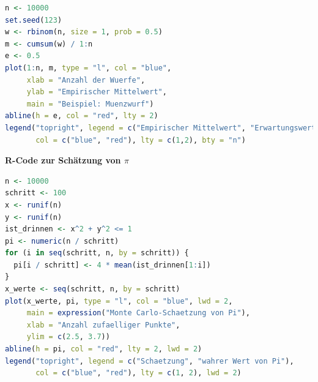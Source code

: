\documentclass[aodsor,preprint]{imsart}
\numberwithin{equation}{section}
\theoremstyle{plain}
\begin{document}
\begin{lstlisting}[language=R, caption={Simulation von Münzwürfen mit R}, label={lst:muenzenwurf}]
n <- 10000
set.seed(123)
w <- rbinom(n, size = 1, prob = 0.5)
m <- cumsum(w) / 1:n
e <- 0.5
plot(1:n, m, type = "l", col = "blue",
     xlab = "Anzahl der Wuerfe",
     ylab = "Empirischer Mittelwert",
     main = "Beispiel: Muenzwurf")
abline(h = e, col = "red", lty = 2)
legend("topright", legend = c("Empirischer Mittelwert", "Erwartungswert (0.5)"),
       col = c("blue", "red"), lty = c(1,2), bty = "n")
\end{lstlisting}

\textbf{R-Code zur Schätzung von \texorpdfstring{$\pi$}{π}}

\begin{lstlisting}[language=R, caption={Monte-Carlo-Schaetzung von $\pi$ mit R}, label={lst:pi_montecarlo}]
n <- 10000
schritt <- 100
x <- runif(n)
y <- runif(n)
ist_drinnen <- x^2 + y^2 <= 1
pi <- numeric(n / schritt)
for (i in seq(schritt, n, by = schritt)) {
  pi[i / schritt] <- 4 * mean(ist_drinnen[1:i])
}
x_werte <- seq(schritt, n, by = schritt)
plot(x_werte, pi, type = "l", col = "blue", lwd = 2,
     main = expression("Monte Carlo-Schaetzung von Pi"),
     xlab = "Anzahl zufaelliger Punkte",
     ylim = c(2.5, 3.7))
abline(h = pi, col = "red", lty = 2, lwd = 2)
legend("topright", legend = c("Schaetzung", "wahrer Wert von Pi"),
       col = c("blue", "red"), lty = c(1, 2), lwd = 2)
\end{lstlisting}


\newpage


\end{document}

